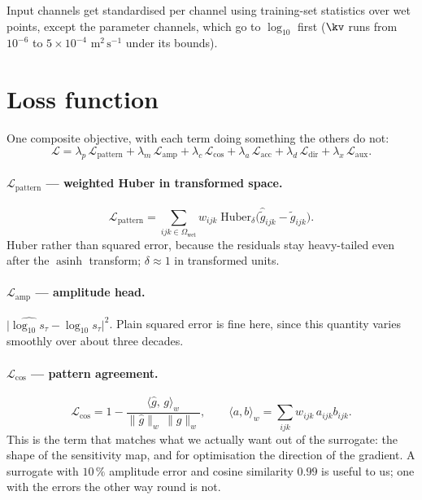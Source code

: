 Input channels get standardised per channel using training-set statistics over
wet points, except the parameter channels, which go to $\log_{10}$ first
($\kv$ runs from $10^{-6}$ to $5\times10^{-4}$ $\mathrm{m^{2}\,s^{-1}}$ under
its  bounds).

\section{Loss function}
\label{sec:loss}

One composite objective, with each term doing something the others do not:
\begin{equation}
\mathcal{L}
= \lambda_{p}\,\mathcal{L}_{\text{pattern}}
+ \lambda_{m}\,\mathcal{L}_{\text{amp}}
+ \lambda_{c}\,\mathcal{L}_{\cos}
+ \lambda_{a}\,\mathcal{L}_{\text{acc}}
+ \lambda_{d}\,\mathcal{L}_{\text{dir}}
+ \lambda_{x}\,\mathcal{L}_{\text{aux}} .
\end{equation}

\paragraph{$\mathcal{L}_{\text{pattern}}$ --- weighted Huber in transformed space.}
\begin{equation}
\mathcal{L}_{\text{pattern}}
= \sum_{ijk\in\Omega_{\text{wet}}} w_{ijk}\;
  \mathrm{Huber}_{\delta}\!\big(\hat{\tilde{g}}_{ijk}-\tilde{g}_{ijk}\big).
\end{equation}
Huber rather than squared error, because the residuals stay heavy-tailed even
after the $\operatorname{asinh}$ transform; $\delta\approx1$ in transformed
units.

\paragraph{$\mathcal{L}_{\text{amp}}$ --- amplitude head.}
$\big|\widehat{\log_{10}s_\tau}-\log_{10}s_\tau\big|^{2}$. Plain squared error
is fine here, since this quantity varies smoothly over about three decades.

\paragraph{$\mathcal{L}_{\cos}$ --- pattern agreement.}
\begin{equation}
\mathcal{L}_{\cos}
= 1 - \frac{\langle \hat{g},\,g\rangle_{w}}
            {\|\hat{g}\|_{w}\,\|g\|_{w}},
\qquad
\langle a,b\rangle_{w}=\sum_{ijk}w_{ijk}\,a_{ijk}b_{ijk}.
\end{equation}
This is the term that matches what we actually want out of the surrogate: the
shape of the sensitivity map, and for optimisation the direction of the
gradient. A surrogate with $10\,\%$ amplitude error and cosine similarity
$0.99$ is useful to us; one with the errors the other way round is not.


